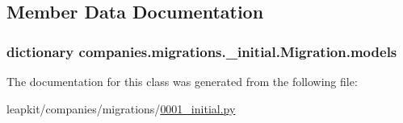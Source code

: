 \subsection{Member Data Documentation}
\hypertarget{classcompanies_1_1migrations_1_10001__initial_1_1_migration_a39a65fd1c9475b0ffdbfad4fc4a122f8}{
\subsubsection[{models}]{\setlength{\rightskip}{0pt plus 5cm}dictionary companies.\-migrations.\-\_\-initial.\-Migration.\-models\hspace{0.3cm}{\ttfamily [static]}}}\label{classcompanies_1_1migrations_1_10001__initial_1_1_migration_a39a65fd1c9475b0ffdbfad4fc4a122f8}


The documentation for this class was generated from the following file\-:\begin{DoxyCompactItemize}
\item 
leapkit/companies/migrations/\hyperlink{companies_2migrations_20001__initial_8py}{0001\-\_\-initial.\-py}\end{DoxyCompactItemize}
